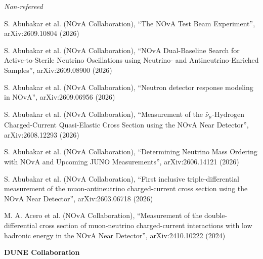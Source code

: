 {\it Non-refereed}
\begin{list2}
\item S. Abubakar et al. (NOvA Collaboration), ``The NOvA Test Beam Experiment'', arXiv:2609.10804 (2026)
\item S. Abubakar et al. (NOvA Collaboration), ``NOvA Dual-Baseline Search for Active-to-Sterile Neutrino Oscillations using Neutrino- and Antineutrino-Enriched Samples'', arXiv:2609.08900 (2026)
\item S. Abubakar et al. (NOvA Collaboration), ``Neutron detector response modeling in NOvA'', arXiv:2609.06956 (2026)
\item S. Abubakar et al. (NOvA Collaboration), ``Measurement of the $\bar\nu_\mu$-Hydrogen Charged-Current Quasi-Elastic Cross Section using the NOvA Near Detector'', arXiv:2608.12293 (2026)
\item S. Abubakar et al. (NOvA Collaboration), ``Determining Neutrino Mass Ordering with NOvA and Upcoming JUNO Measurements'', arXiv:2606.14121 (2026)
\item S. Abubakar et al. (NOvA Collaboration), ``First inclusive triple-differential measurement of the muon-antineutrino charged-current cross section using the NOvA Near Detector'', arXiv:2603.06718 (2026)
\item M. A. Acero et al. (NOvA Collaboration), ``Measurement of the double-differential cross section of muon-neutrino charged-current interactions with low hadronic energy in the NOvA Near Detector'', arXiv:2410.10222 (2024)
\end{list2}

\newpage
{\bf DUNE Collaboration}

